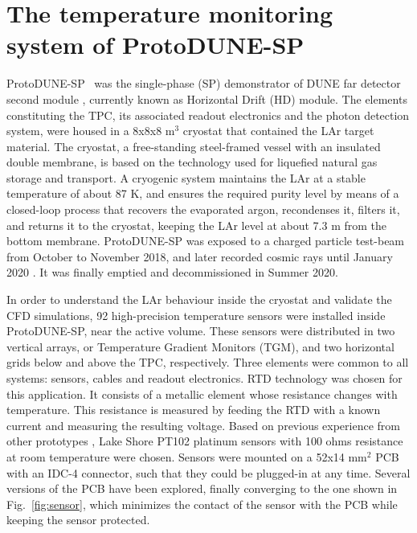 \section{The temperature monitoring system of ProtoDUNE-SP}
\label{sec:protoDUNE}

\noindent ProtoDUNE-SP~\cite{pdsp_tdr} was the single-phase (SP) demonstrator of DUNE far detector second module \cite{dune_tdr4}, currently known as Horizontal Drift (HD) module. %
The elements constituting the TPC, its associated readout electronics and the photon detection system, were housed in a 8x8x8 m$^3$ cryostat that contained the LAr target material. The cryostat, a free-standing steel-framed vessel with an insulated double membrane, is based on the technology used for liquefied natural gas storage and transport. A cryogenic system maintains the LAr at a stable temperature of about 87 K, and ensures the required purity level by means of a closed-loop process that recovers the evaporated argon, recondenses it, filters it, and returns it to the cryostat, keeping the LAr level at about 7.3 m from the bottom membrane. ProtoDUNE-SP was exposed to a charged particle test-beam from October to November 2018, and later recorded cosmic rays until January 2020 \cite{pdsp_1,pdsp_2}. It was finally emptied and decommissioned in Summer 2020.

In order to understand the LAr behaviour inside the cryostat and validate the CFD simulations, 92 high-precision temperature sensors were installed inside ProtoDUNE-SP, near the active volume. These sensors were distributed in two vertical arrays, or Temperature Gradient Monitors (TGM), and two horizontal grids below and above the TPC, respectively. Three elements were common to all systems: sensors, cables and readout electronics. RTD technology \cite{minco} was chosen for this application. It consists of a metallic element whose resistance changes with temperature. This resistance is measured by feeding the RTD with a known current and measuring the resulting voltage. Based on previous experience from other prototypes \cite{35t_1}, Lake Shore PT102 platinum sensors \cite{pt102} with 100 ohms resistance at room temperature were chosen. Sensors were mounted on a 52x14 mm$^2$ PCB with an IDC-4 connector, such that they could be plugged-in at any time. Several versions of the PCB have been explored, finally converging to the one shown in Fig.~\ref{fig:sensor}, which minimizes the contact of the sensor with the PCB while keeping the sensor protected. 

